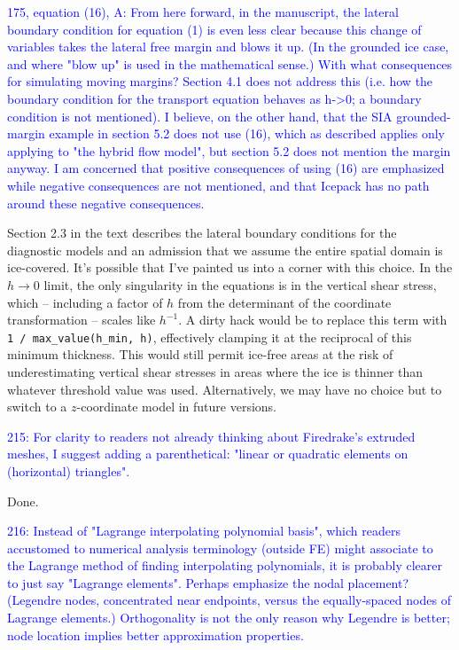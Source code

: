\documentclass{article}
\theoremstyle{definition}
\theoremstyle{plain}
\begin{document}
\textcolor{blue}{175, equation (16), A:  From here forward, in the manuscript, the lateral boundary condition for equation (1) is even less clear because this change of variables takes the lateral free margin and blows it up.  (In the grounded ice case, and where "blow up" is used in the mathematical sense.)  With what consequences for simulating moving margins?  Section 4.1 does not address this (i.e. how the boundary condition for the transport equation behaves as h->0; a boundary condition is not mentioned).  I believe, on the other hand, that the SIA grounded-margin example in section 5.2 does not use (16), which as described applies only applying to "the hybrid flow model", but section 5.2 does not mention the margin anyway.  I am concerned that positive consequences of using (16) are emphasized while negative consequences are not mentioned, and that Icepack has no path around these negative consequences.}

Section 2.3 in the text describes the lateral boundary conditions for the diagnostic models and an admission that we assume the entire spatial domain is ice-covered.
It's possible that I've painted us into a corner with this choice.
In the $h \to 0$ limit, the only singularity in the equations is in the vertical shear stress, which -- including a factor of $h$ from the determinant of the coordinate transformation -- scales like $h^{-1}$.
A dirty hack would be to replace this term with \texttt{1 / max\_value(h\_min, h)}, effectively clamping it at the reciprocal of this minimum thickness.
This would still permit ice-free areas at the risk of underestimating vertical shear stresses in areas where the ice is thinner than whatever threshold value was used.
Alternatively, we may have no choice but to switch to a $z$-coordinate model in future versions.

\textcolor{blue}{215:  For clarity to readers not already thinking about Firedrake's extruded meshes, I suggest adding a parenthetical: "linear or quadratic elements on (horizontal) triangles".}

Done.

\textcolor{blue}{216:  Instead of "Lagrange interpolating polynomial basis", which readers accustomed to numerical analysis terminology (outside FE) might associate to the Lagrange method of finding interpolating polynomials, it is probably clearer to just say "Lagrange elements".  Perhaps emphasize the nodal placement?  (Legendre nodes, concentrated near endpoints, versus the equally-spaced nodes of Lagrange elements.)  Orthogonality is not the only reason why Legendre is better; node location implies better approximation properties.}
\end{document}
